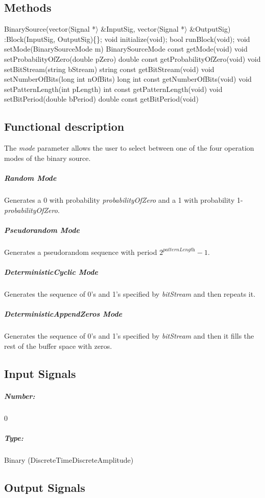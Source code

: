 \subsection*{Methods}

BinarySource(vector$\langle$Signal *$\rangle$ \&InputSig, vector$\langle$Signal *$\rangle$ \&OutputSig) :Block(InputSig, OutputSig)\{\};
\bigbreak	
void initialize(void);
\bigbreak	
bool runBlock(void);
\bigbreak
void setMode(BinarySourceMode m)
\bigbreak
BinarySourceMode const getMode(void)
\bigbreak	
void setProbabilityOfZero(double pZero)
\bigbreak
double const getProbabilityOfZero(void)
\bigbreak	
void setBitStream(string bStream)
\bigbreak
string const getBitStream(void)
\bigbreak	
void setNumberOfBits(long int nOfBits)
\bigbreak
long int const getNumberOfBits(void)
\bigbreak	
void setPatternLength(int pLength)
\bigbreak
int const getPatternLength(void)
\bigbreak	
void setBitPeriod(double bPeriod)
\bigbreak
double const getBitPeriod(void)

\subsection*{Functional description}

The \textit{mode} parameter allows the user to select between one of the four operation modes of the binary source.

\subparagraph*{Random Mode}
Generates a 0 with probability \textit{probabilityOfZero} and a 1 with probability 1-\textit{probabilityOfZero}.

\subparagraph*{Pseudorandom Mode}
Generates a pseudorandom sequence with period $2^\textit{patternLength}-1$.

\subparagraph*{DeterministicCyclic Mode}
Generates the sequence of 0's and 1's specified by \textit{bitStream} and then repeats it.

\subparagraph*{DeterministicAppendZeros Mode}
Generates the sequence of 0's and 1's specified by \textit{bitStream} and then it fills the rest of the buffer space with zeros.



\subsection*{Input Signals}


\subparagraph*{Number:} 0

\subparagraph*{Type:} Binary (DiscreteTimeDiscreteAmplitude)

\subsection*{Output Signals}


